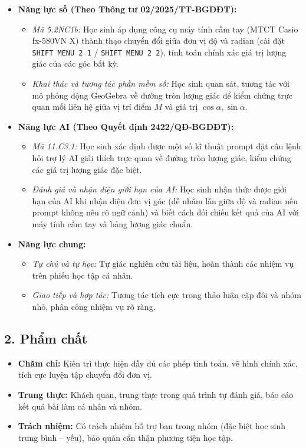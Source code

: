 \documentclass[12pt, a4paper]{article}
\begin{document}
\begin{itemize}[leftmargin=1.2cm]
    \item \textbf{Năng lực số (Theo Thông tư 02/2025/TT-BGDĐT):}
    \begin{itemize}[leftmargin=0.6cm]
        \item \textit{Mã 5.2NC1b:} Học sinh áp dụng công cụ máy tính cầm tay (MTCT Casio fx-580VN X) thành thạo chuyển đổi giữa đơn vị độ và radian (cài đặt \texttt{SHIFT MENU 2 1} / \texttt{SHIFT MENU 2 2}), tính toán chính xác giá trị lượng giác của các góc bất kỳ.
        \item \textit{Khai thác và tương tác phần mềm số:} Học sinh quan sát, tương tác với mô phỏng động GeoGebra về đường tròn lượng giác để kiểm chứng trực quan mối liên hệ giữa vị trí điểm $M$ và giá trị $\cos\alpha, \sin\alpha$.
    \end{itemize}

    \item \textbf{Năng lực AI (Theo Quyết định 2422/QĐ-BGDĐT):}
    \begin{itemize}[leftmargin=0.6cm]
        \item \textit{Mã 11.C3.1:} Học sinh xác định được một số kĩ thuật prompt đặt câu lệnh hỏi trợ lý AI giải thích trực quan về đường tròn lượng giác, kiểm chứng các giá trị lượng giác đặc biệt.
        \item \textit{Đánh giá và nhận diện giới hạn của AI:} Học sinh nhận thức được giới hạn của AI khi nhận diện đơn vị góc (dễ nhầm lẫn giữa độ và radian nếu prompt không nêu rõ ngữ cảnh) và biết cách đối chiếu kết quả của AI với máy tính cầm tay và bảng lượng giác chuẩn.
    \end{itemize}

    \item \textbf{Năng lực chung:}
    \begin{itemize}[leftmargin=0.6cm]
        \item \textit{Tự chủ và tự học:} Tự giác nghiên cứu tài liệu, hoàn thành các nhiệm vụ trên phiếu học tập cá nhân.
        \item \textit{Giao tiếp và hợp tác:} Tương tác tích cực trong thảo luận cặp đôi và nhóm nhỏ, phân công nhiệm vụ rõ ràng.
    \end{itemize}
\end{itemize}

\subsection*{2. Phẩm chất}

\begin{itemize}[leftmargin=1.2cm]
    \item \textbf{Chăm chỉ:} Kiên trì thực hiện đầy đủ các phép tính toán, vẽ hình chính xác, tích cực luyện tập chuyển đổi đơn vị.
    \item \textbf{Trung thực:} Khách quan, trung thực trong quá trình tự đánh giá, báo cáo kết quả bài làm cá nhân và nhóm.
    \item \textbf{Trách nhiệm:} Có trách nhiệm hỗ trợ bạn trong nhóm (đặc biệt học sinh trung bình -- yếu), bảo quản cẩn thận phương tiện học tập.
\end{itemize}
\end{document}
